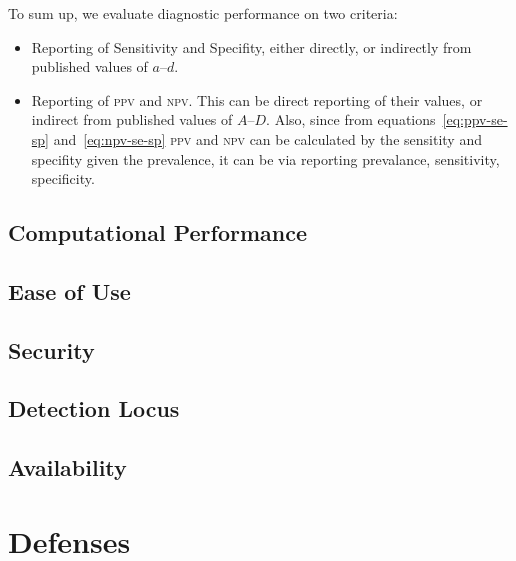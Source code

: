 \documentclass[conference]{IEEEtran}
\begin{document}
To sum up, we evaluate diagnostic performance on two criteria:

\begin{itemize}
\item Reporting of Sensitivity and Specifity, either directly, or
  indirectly from published values of $a$--$d$.
\item Reporting of \textsc{ppv} and \textsc{npv}. This can be direct
  reporting of their values, or indirect from published values of
  $A$--$D$. Also, since from equations~\ref{eq:ppv-se-sp}
  and~\ref{eq:npv-se-sp} \textsc{ppv} and \textsc{npv} can be
  calculated by the sensitity and specifity given the prevalence, it
  can be via reporting prevalance, sensitivity, specificity.
\end{itemize}
 
\subsection{Computational Performance}

\subsection{Ease of Use}

\subsection{Security}

\subsection{Detection Locus}

\subsection{Availability}

\section{Defenses}
\label{sec:defs}
\end{document}
